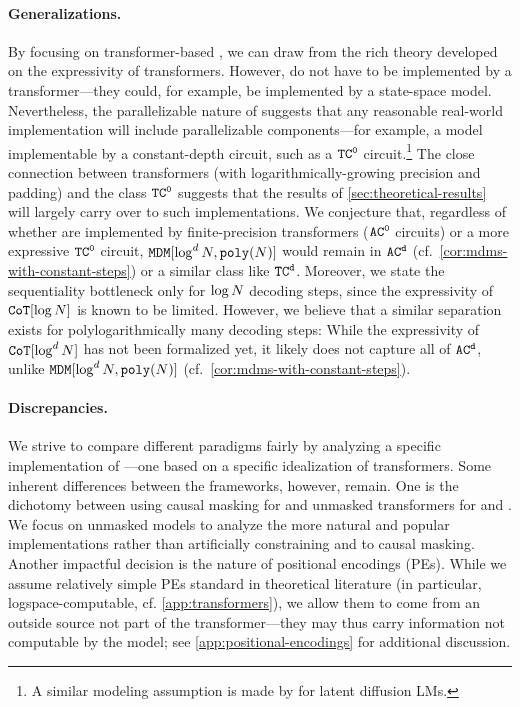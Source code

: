 \documentclass{article} %
\begin{document}
\paragraph{Generalizations.}
By focusing on transformer-based \MDMsAcr, we can draw from the rich theory developed on the expressivity of transformers. 
However, \MDMsAcr do not have to be implemented by a transformer---they could, for example, be implemented by a state-space model.
Nevertheless, the parallelizable nature of \MDMsAcr suggests that any reasonable real-world implementation will include parallelizable components---for example, a model implementable by a constant-depth circuit, such as a ${{{{{{\mathtt{TC}}}^{\mathtt{0}}}}}}$ circuit.\footnote{A similar modeling assumption is made by \citet{liu2025perfectdiffusionmathsftc0,liu2025serialscalinghypothesis} for latent diffusion LMs.}
The close connection between transformers (with logarithmically-growing precision and padding) and the class ${{{{{{\mathtt{TC}}}^{\mathtt{0}}}}}}$ \citep{merrill-sabharwal-2023-parallelism,li2024chain} suggests that the results of \cref{sec:theoretical-results} will largely carry over to such implementations.
We conjecture that, regardless of whether \MDMsAcr are implemented by finite-precision transformers (${{{{{{\mathtt{AC}}}^{\mathtt{0}}}}}}$ circuits) or a more expressive ${{{{{{\mathtt{TC}}}^{\mathtt{0}}}}}}$ circuit, $\MDMClass[\log^d\strlen, \polyFun{\strlen}]$ would remain in ${{{{{{\mathtt{AC}}}^{\mathtt{d}}}}}}$ (cf.~\cref{cor:mdms-with-constant-steps}) or a similar class like ${{{{{{\mathtt{TC}}}^{\mathtt{d}}}}}}$.
Moreover, we state the sequentiality bottleneck only for $\log {{N}}$ decoding steps, since the expressivity of ${\mathtt{CoT}}[\log{{N}}]$ is known to be limited.
However, we believe that a similar separation exists for polylogarithmically many decoding steps: While the expressivity of ${\mathtt{CoT}}[\log^d{{N}}]$ has not been formalized yet, it likely does not capture all of ${{{{{{\mathtt{AC}}}^{\mathtt{d}}}}}}$, unlike $\MDMClass[\log^d\strlen, \polyFun{\strlen}]$ (cf.~\cref{cor:mdms-with-constant-steps}).


\paragraph{Discrepancies.}
We strive to compare different paradigms fairly by analyzing a specific implementation of \MDMsAcr---one based on a specific idealization of transformers.
Some inherent differences between the frameworks, however, remain.
One is the dichotomy between using causal masking for \CoTAcr and unmasked transformers for \MDMsAcr and \LTsAcr.
We focus on unmasked models to analyze the more natural and popular implementations rather than artificially constraining \MDMsAcr and \LTsAcr to causal masking.
Another impactful decision is the nature of positional encodings (PEs). 
While we assume relatively simple PEs standard in theoretical literature (in particular, logspace-computable, cf. \cref{app:transformers}), we allow them to come from an outside source not part of the transformer---they may thus carry information not computable by the model; see \cref{app:positional-encodings} for additional discussion.
\end{document}
